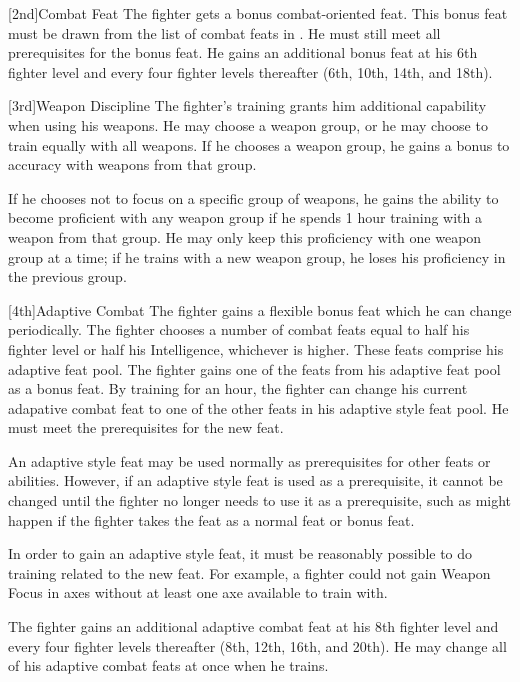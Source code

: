         [2nd]{Combat Feat}
        The fighter gets a bonus combat-oriented feat.
        This bonus feat must be drawn from the list of combat feats in .
        He must still meet all prerequisites for the bonus feat.
        He gains an additional bonus feat at his 6th fighter level and every four fighter levels thereafter (6th, 10th, 14th, and 18th).

        [3rd]{Weapon Discipline}
        The fighter's training grants him additional capability when using his weapons.
        He may choose a weapon group, or he may choose to train equally with all weapons.
        If he chooses a weapon group, he gains a  bonus to accuracy with weapons from that group.

        If he chooses not to focus on a specific group of weapons, he gains the ability to become proficient with any weapon group if he spends 1 hour training with a weapon from that group.
        He may only keep this proficiency with one weapon group at a time; if he trains with a new weapon group, he loses his proficiency in the previous group.

        [4th]{Adaptive Combat}
        The fighter gains a flexible bonus feat which he can change periodically.
        The fighter chooses a number of combat feats equal to half his fighter level or half his Intelligence, whichever is higher.
        These feats comprise his adaptive feat pool.
        The fighter gains one of the feats from his adaptive feat pool as a bonus feat.
        By training for an hour, the fighter can change his current adapative combat feat to one of the other feats in his adaptive style feat pool.
        He must meet the prerequisites for the new feat.

        \par An adaptive style feat may be used normally as prerequisites for other feats or abilities.
        However, if an adaptive style feat is used as a prerequisite, it cannot be changed until the fighter no longer needs to use it as a prerequisite, such as might happen if the fighter takes the feat as a normal feat or bonus feat.

        \par In order to gain an adaptive style feat, it must be reasonably possible to do training related to the new feat.
        For example, a fighter could not gain Weapon Focus in axes without at least one axe available to train with.

        The fighter gains an additional adaptive combat feat at his 8th fighter level and every four fighter levels thereafter (8th, 12th, 16th, and 20th).
        He may change all of his adaptive combat feats at once when he trains.

